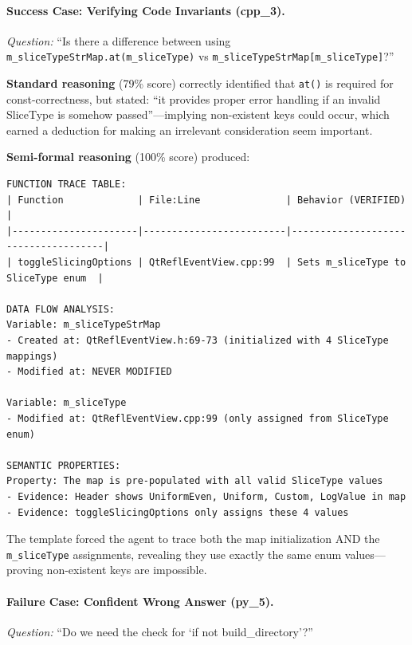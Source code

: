 \documentclass[]{meta}
\begin{document}
\paragraph{Success Case: Verifying Code Invariants (cpp\_3).}
\emph{Question:} ``Is there a difference between using \texttt{m\_sliceTypeStrMap.at(m\_sliceType)} vs \texttt{m\_sliceTypeStrMap[m\_sliceType]}?''

\textbf{Standard reasoning} (79\% score) correctly identified that \texttt{at()} is required for const-correctness, but stated: ``it provides proper error handling if an invalid SliceType is somehow passed''---implying non-existent keys could occur, which earned a deduction for making an irrelevant consideration seem important.

\textbf{Semi-formal reasoning} (100\% score) produced:

\begin{tcolorbox}[colback=gray!5, colframe=gray!50, boxrule=0.3pt, breakable]
\small
\begin{verbatim}
FUNCTION TRACE TABLE:
| Function             | File:Line               | Behavior (VERIFIED)                 |
|----------------------|-------------------------|-------------------------------------|
| toggleSlicingOptions | QtReflEventView.cpp:99  | Sets m_sliceType to SliceType enum  |

DATA FLOW ANALYSIS:
Variable: m_sliceTypeStrMap
- Created at: QtReflEventView.h:69-73 (initialized with 4 SliceType mappings)
- Modified at: NEVER MODIFIED

Variable: m_sliceType
- Modified at: QtReflEventView.cpp:99 (only assigned from SliceType enum)

SEMANTIC PROPERTIES:
Property: The map is pre-populated with all valid SliceType values
- Evidence: Header shows UniformEven, Uniform, Custom, LogValue in map
- Evidence: toggleSlicingOptions only assigns these 4 values
\end{verbatim}
\end{tcolorbox}

The template forced the agent to trace both the map initialization AND the \texttt{m\_sliceType} assignments, revealing they use exactly the same enum values---proving non-existent keys are impossible.

\paragraph{Failure Case: Confident Wrong Answer (py\_5).}
\emph{Question:} ``Do we need the check for `if not build\_directory'?''
\end{document}
